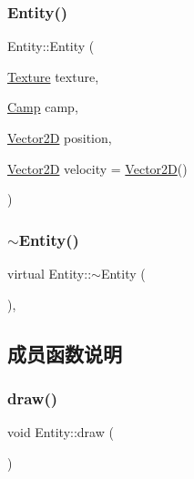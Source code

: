 \subsubsection{\texorpdfstring{Entity()}{Entity()}}
{\footnotesize\ttfamily Entity\+::\+Entity (\begin{DoxyParamCaption}\item[{\hyperlink{struct_texture}{Texture}}]{texture,  }\item[{\hyperlink{_entity_8h_ad54c4fe39f1c51b786c24ae0b7763b44}{Camp}}]{camp,  }\item[{\hyperlink{_vector2_d_8hpp_aa1f1145650f1dd9bddf7335ec6434d7c}{Vector2D}}]{position,  }\item[{\hyperlink{_vector2_d_8hpp_aa1f1145650f1dd9bddf7335ec6434d7c}{Vector2D}}]{velocity = {\ttfamily \hyperlink{_vector2_d_8hpp_aa1f1145650f1dd9bddf7335ec6434d7c}{Vector2D}()} }\end{DoxyParamCaption})\hspace{0.3cm}{\ttfamily [inline]}}

\mbox{\label{class_entity_a588098978eea6a3486b7361605ff3f0f}} 
\subsubsection{\texorpdfstring{$\sim$\+Entity()}{~Entity()}}
{\footnotesize\ttfamily virtual Entity\+::$\sim$\+Entity (\begin{DoxyParamCaption}{ }\end{DoxyParamCaption})\hspace{0.3cm}{\ttfamily [inline]}, {\ttfamily [virtual]}}



\subsection{成员函数说明}
\mbox{\label{class_entity_a7666f416dd0d1fce0f1133f78df44476}} 
\subsubsection{\texorpdfstring{draw()}{draw()}}
{\footnotesize\ttfamily void Entity\+::draw (\begin{DoxyParamCaption}{ }\end{DoxyParamCaption})\hspace{0.3cm}{\ttfamily [virtual]}}



